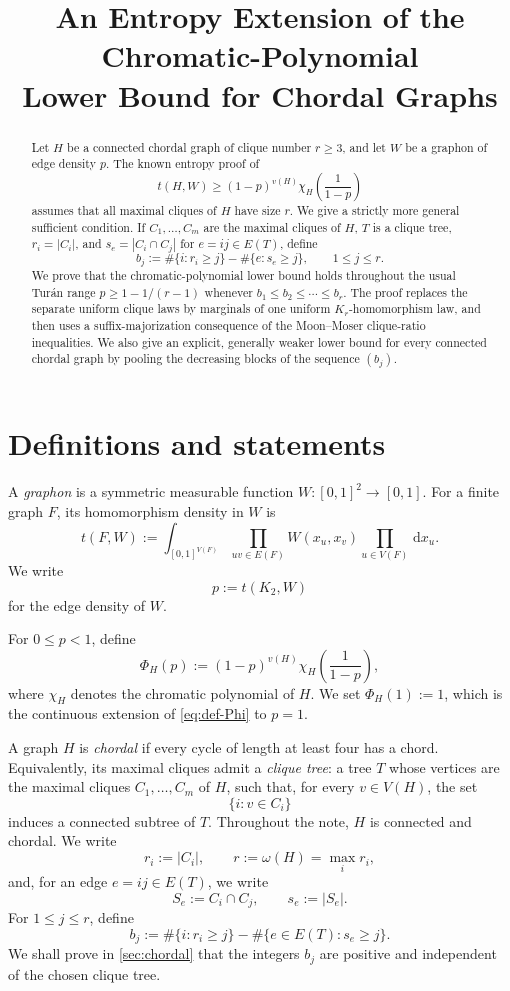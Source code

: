 \documentclass[11pt]{article}
\title{An Entropy Extension of the Chromatic-Polynomial\\
Lower Bound for Chordal Graphs}
\author{}
\date{}
\numberwithin{equation}{section}
\newcommand{\dd}{\,\mathrm d}
\newcommand{\K}{K}
\newcommand{\PhiH}{\Phi_H}
\begin{document}
\maketitle

\begin{abstract}
Let $H$ be a connected chordal graph of clique number $r\geq 3$, and let
$W$ be a graphon of edge density $p$.  The known entropy proof of
\[
 t(H,W)\geq (1-p)^{v(H)}\chi_H\!\left(\frac{1}{1-p}\right)
\]
assumes that all maximal cliques of $H$ have size $r$.  We give a strictly
more general sufficient condition.  If $C_1,\dots,C_m$ are the maximal
cliques of $H$, $T$ is a clique tree, $r_i=|C_i|$, and
$s_e=|C_i\cap C_j|$ for $e=ij\in E(T)$, define
\[
 b_j:=\#\{i:r_i\geq j\}-\#\{e:s_e\geq j\},
 \qquad 1\leq j\leq r.
\]
We prove that the chromatic-polynomial lower bound holds throughout the
usual Tur\'an range $p\geq 1-1/(r-1)$ whenever
$b_1\leq b_2\leq\cdots\leq b_r$.  The proof replaces the separate uniform
clique laws by marginals of one uniform $K_r$-homomorphism law, and then
uses a suffix-majorization consequence of the Moon--Moser clique-ratio
inequalities.  We also give an explicit, generally weaker lower bound for
every connected chordal graph by pooling the decreasing blocks of the
sequence $(b_j)$.
\end{abstract}

\section{Definitions and statements}

A \emph{graphon} is a symmetric measurable function
$W:[0,1]^2\to[0,1]$.  For a finite graph $F$, its homomorphism density in
$W$ is
\[
 t(F,W)
 :=
 \int_{[0,1]^{V(F)}}
 \prod_{uv\in E(F)}W(x_u,x_v)
 \prod_{u\in V(F)}\dd x_u.
\]
We write
\[
 p:=t(\K_2,W)
\]
for the edge density of $W$.

For $0\leq p<1$, define
\[
 \PhiH(p)
 :=
 (1-p)^{v(H)}\chi_H\!\left(\frac{1}{1-p}\right),\label{eq:def-Phi}
\]
where $\chi_H$ denotes the chromatic polynomial of $H$.  We set
$\PhiH(1):=1$, which is the continuous extension of
\eqref{eq:def-Phi} to $p=1$.

A graph $H$ is \emph{chordal} if every cycle of length at least four has a
chord.  Equivalently, its maximal cliques admit a \emph{clique tree}: a
tree $T$ whose vertices are the maximal cliques $C_1,\dots,C_m$ of $H$,
such that, for every $v\in V(H)$, the set
\[
 \{i:v\in C_i\}
\]
induces a connected subtree of $T$.  Throughout the note, $H$ is connected
and chordal.  We write
\[
 r_i:=|C_i|,
 \qquad
 r:=\omega(H)=\max_i r_i,
\]
and, for an edge $e=ij\in E(T)$, we write
\[
 S_e:=C_i\cap C_j,
 \qquad
 s_e:=|S_e|.
\]
For $1\leq j\leq r$, define
\begin{equation}
 b_j
 :=
 \#\{i:r_i\geq j\}
 -
 \#\{e\in E(T):s_e\geq j\}.\label{eq:def-b}
\end{equation}
We shall prove in \cref{sec:chordal} that the integers $b_j$ are positive
and independent of the chosen clique tree.
\end{document}
